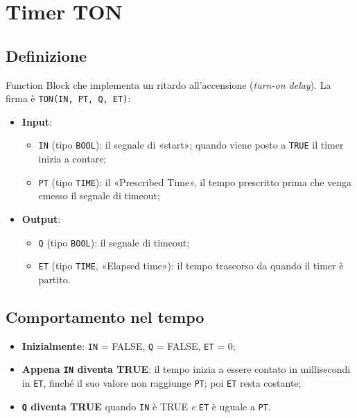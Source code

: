 \chapter{Timer TON}
\label{cap:timer-ton}

\section{Definizione}
\begin{defn}
Function Block che implementa un ritardo all'accensione (\emph{turn-on delay}). La firma è \texttt{TON(IN, PT, Q, ET)}:
\begin{itemize}
    \item \textbf{Input}:
    \begin{itemize}
        \item \texttt{IN} (tipo \texttt{BOOL}): il segnale di «start»; quando viene posto a \texttt{TRUE} il timer inizia a contare;
        \item \texttt{PT} (tipo \texttt{TIME}): il «Prescribed Time», il tempo prescritto prima che venga emesso il segnale di timeout;
    \end{itemize}
    \item \textbf{Output}:
    \begin{itemize}
        \item \texttt{Q} (tipo \texttt{BOOL}): il segnale di timeout;
        \item \texttt{ET} (tipo \texttt{TIME}, «Elapsed time»): il tempo trascorso da quando il timer è partito.
    \end{itemize}
\end{itemize}
\end{defn}

\section{Comportamento nel tempo}
\begin{itemize}
    \item \textbf{Inizialmente}: \texttt{IN} = FALSE, \texttt{Q} = FALSE, \texttt{ET} = 0;
    \item \textbf{Appena \texttt{IN} diventa TRUE}: il tempo inizia a essere contato in millisecondi in \texttt{ET}, finché il suo valore non raggiunge \texttt{PT}; poi \texttt{ET} resta costante;
    \item \textbf{\texttt{Q} diventa TRUE} quando \texttt{IN} è TRUE \emph{e} \texttt{ET} è uguale a \texttt{PT}.
\end{itemize}


